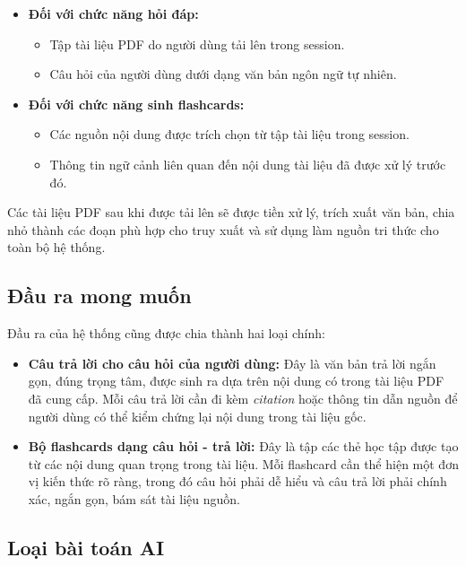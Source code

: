 \documentclass[12pt]{ai_conquer2026}
\begin{document}
\begin{itemize}
    \item \textbf{Đối với chức năng hỏi đáp:}
    \begin{itemize}
        \item Tập tài liệu PDF do người dùng tải lên trong session.
        \item Câu hỏi của người dùng dưới dạng văn bản ngôn ngữ tự nhiên.
    \end{itemize}
    
    \item \textbf{Đối với chức năng sinh flashcards:}
    \begin{itemize}
        \item Các nguồn nội dung được trích chọn từ tập tài liệu trong session.
        \item Thông tin ngữ cảnh liên quan đến nội dung tài liệu đã được xử lý trước đó.
    \end{itemize}
\end{itemize}

Các tài liệu PDF sau khi được tải lên sẽ được tiền xử lý, trích xuất văn bản, chia nhỏ thành các đoạn phù hợp cho truy xuất và sử dụng làm nguồn tri thức cho toàn bộ hệ thống.

\subsection{Đầu ra mong muốn}

Đầu ra của hệ thống cũng được chia thành hai loại chính:

\begin{itemize}
    \item \textbf{Câu trả lời cho câu hỏi của người dùng:} Đây là văn bản trả lời ngắn gọn, đúng trọng tâm, được sinh ra dựa trên nội dung có trong tài liệu PDF đã cung cấp. Mỗi câu trả lời cần đi kèm \textit{citation} hoặc thông tin dẫn nguồn để người dùng có thể kiểm chứng lại nội dung trong tài liệu gốc.
    
    \item \textbf{Bộ flashcards dạng câu hỏi - trả lời:} Đây là tập các thẻ học tập được tạo từ các nội dung quan trọng trong tài liệu. Mỗi flashcard cần thể hiện một đơn vị kiến thức rõ ràng, trong đó câu hỏi phải dễ hiểu và câu trả lời phải chính xác, ngắn gọn, bám sát tài liệu nguồn.
\end{itemize}

\subsection{Loại bài toán AI}
\end{document}
